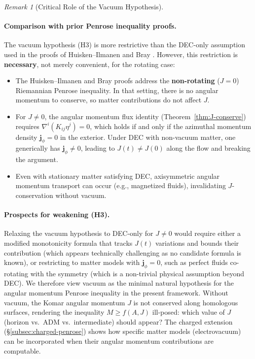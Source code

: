 \documentclass[12pt]{article}
\theoremstyle{plain}
\theoremstyle{definition}
\theoremstyle{remark}
\newtheorem{remark}[theorem]{Remark}
\newcommand{\momdens}{\boldsymbol{j}}
\begin{document}
\begin{remark}[Critical Role of the Vacuum Hypothesis]
\paragraph{Comparison with prior Penrose inequality proofs.}
The vacuum hypothesis (H3) is more restrictive than the DEC-only assumption used in the proofs of Huisken--Ilmanen \cite{huisken2001} and Bray \cite{bray2001}. However, this restriction is \textbf{necessary}, not merely convenient, for the rotating case:
\begin{itemize}
    \item The Huisken--Ilmanen and Bray proofs address the \textbf{non-rotating} ($J=0$) Riemannian Penrose inequality. In that setting, there is no angular momentum to conserve, so matter contributions do not affect $J$.
    \item For $J \neq 0$, the angular momentum flux identity (Theorem~\ref{thm:J-conserve}) requires $\nabla^i(K_{ij}\eta^j) = 0$, which holds if and only if the azimuthal momentum density $\momdens_\phi = 0$ in the exterior. Under DEC with non-vacuum matter, one generically has $\momdens_\phi \neq 0$, leading to $J(t) \neq J(0)$ along the flow and breaking the argument.
    \item Even with stationary matter satisfying DEC, axisymmetric angular momentum transport can occur (e.g., magnetized fluids), invalidating $J$-conservation without vacuum.
\end{itemize}

\paragraph{Prospects for weakening (H3).}
Relaxing the vacuum hypothesis to DEC-only for $J \neq 0$ would require either a modified monotonicity formula that tracks $J(t)$ variations and bounds their contribution (which appears technically challenging as no candidate formula is known), or restricting to matter models with $\momdens_\phi = 0$, such as perfect fluids co-rotating with the symmetry (which is a non-trivial physical assumption beyond DEC).
We therefore view vacuum as the minimal natural hypothesis for the angular momentum Penrose inequality in the present framework. Without vacuum, the Komar angular momentum $J$ is not conserved along homologous surfaces, rendering the inequality $M \geq f(A, J)$ ill-posed: which value of $J$ (horizon vs.\ ADM vs.\ intermediate) should appear? The charged extension (\S\ref{subsec:charged-penrose}) shows how specific matter models (electrovacuum) can be incorporated when their angular momentum contributions are computable.


\end{remark}
\end{document}
